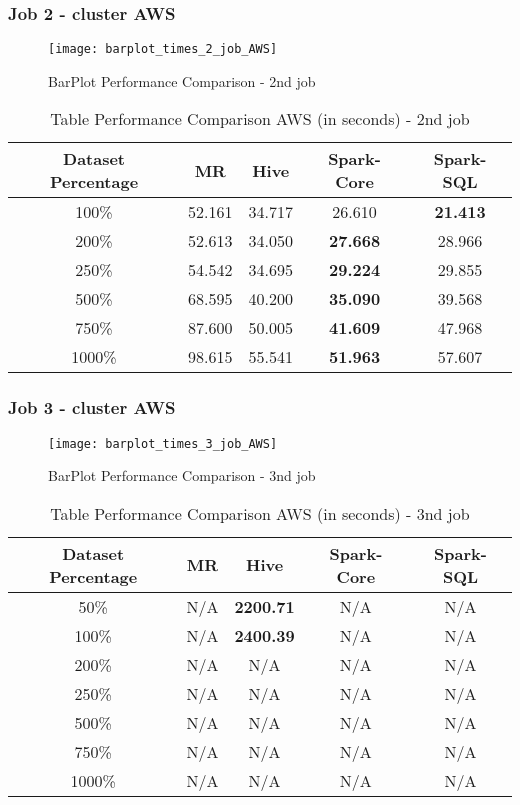   
\subsubsection{Job 2 - cluster AWS}

\begin{figure}[!ht]
    \centering
    \texttt{[image: barplot\_times\_2\_job\_AWS]}
    \caption{BarPlot Performance Comparison - 2nd job}
\end{figure}

\begin{table}[!ht]
  \centering
  \caption{Table Performance Comparison AWS (in seconds) - 2nd job}
  \label{tab:performance}
  \begin{tabular}{c|c|c|c|c}
    \toprule
    Dataset Percentage & MR & Hive & Spark-Core & Spark-SQL \\
    \midrule
    100\% & 52.161 & 34.717 & 26.610 & \textbf{21.413} \\
    200\% & 52.613 & 34.050 & \textbf{27.668} & 28.966 \\
    250\% & 54.542 & 34.695 & \textbf{29.224} & 29.855 \\
    500\% & 68.595 & 40.200 & \textbf{35.090} & 39.568 \\
    750\% & 87.600 & 50.005 & \textbf{41.609} & 47.968 \\
    1000\% & 98.615 & 55.541 & \textbf{51.963} & 57.607 \\
    \bottomrule
  \end{tabular}
\end{table}
\newpage

\subsubsection{Job 3 - cluster AWS}

\begin{figure}[!ht]
    \centering
    \texttt{[image: barplot\_times\_3\_job\_AWS]}
    \caption{BarPlot Performance Comparison - 3nd job}
\end{figure}

\begin{table}[!ht]
  \centering
  \caption{Table Performance Comparison AWS (in seconds) - 3nd job}
  \label{tab:performance}
  \begin{tabular}{c|c|c|c|c}
    \toprule
    Dataset Percentage & MR & Hive & Spark-Core & Spark-SQL \\
    \midrule
    50\% & N/A & \textbf{2200.71} & N/A & N/A \\
    100\% & N/A & \textbf{2400.39} & N/A & N/A \\
    200\% & N/A & N/A & N/A & N/A \\
    250\% & N/A & N/A & N/A & N/A \\
    500\% & N/A & N/A & N/A & N/A \\
    750\% & N/A & N/A & N/A & N/A \\
    1000\% & N/A & N/A & N/A & N/A \\
    \bottomrule
  \end{tabular}
\end{table}
\newpage

